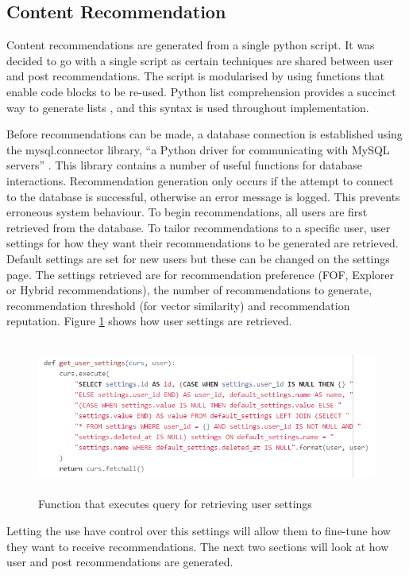 \subsection{Content Recommendation}
Content recommendations are generated from a single python script. It was decided to go with a single script as certain techniques are shared between user and post recommendations. The script is modularised by using functions that enable code blocks to be re-used. Python list comprehension provides a succinct way to generate lists \cite{Python:ListComprehension}, and this syntax is used throughout implementation.

Before recommendations can be made, a database connection is established using the mysql.connector library, ``a Python driver for communicating with MySQL servers'' \cite{MySQL:MySQLConnector}. This library contains a number of useful functions for database interactions. Recommendation generation only occurs if the attempt to connect to the database is successful, otherwise an error message is logged. This prevents erroneous system behaviour. To begin recommendations, all users are first retrieved from the database. To tailor recommendations to a specific user, user settings for how they want their recommendations to be generated are retrieved. Default settings are set for new users but these can be changed on the settings page. The settings retrieved are for recommendation preference (FOF, Explorer or Hybrid recommendations), the number of recommendations to generate, recommendation threshold (for vector similarity) and recommendation reputation. Figure \ref{fig:RecommendationSettings} shows how user settings are retrieved.


\begin{figure}[H]
\centering
\includegraphics[height=2in]{Images/Implementation/RecommendationSettings}
\caption{Function that executes query for retrieving user settings}
\label{fig:RecommendationSettings}
\end{figure}

\noindent Letting the use have control over this settings will allow them to fine-tune how they want to receive recommendations. The next two sections will look at how user and post recommendations are generated.

